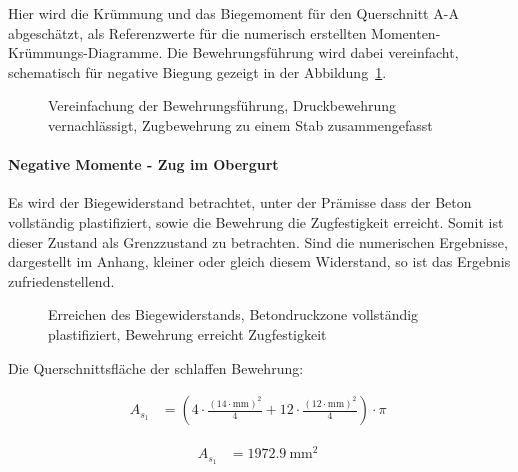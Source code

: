 \documentclass[
  11pt,
  letterpaper,
]{scrreprt}
\let\oldparagraph\paragraph
\renewcommand{\paragraph}[1]{\oldparagraph{#1}\mbox{}}
\begin{document}
Hier wird die Krümmung und das Biegemoment für den Querschnitt A-A
abgeschätzt, als Referenzwerte für die numerisch erstellten
Momenten-Krümmungs-Diagramme. Die Bewehrungsführung wird dabei
vereinfacht, schematisch für negative Biegung gezeigt in der
Abbildung~\ref{fig-t6_qs_approx}.

\begin{figure}[H]


\caption{\label{fig-t6_qs_approx}Vereinfachung der Bewehrungsführung,
Druckbewehrung vernachlässigt, Zugbewehrung zu einem Stab
zusammengefasst}

\end{figure}%

\paragraph{Negative Momente - Zug im
Obergurt}\label{negative-momente---zug-im-obergurt}

Es wird der Biegewiderstand betrachtet, unter der Prämisse dass der
Beton vollständig plastifiziert, sowie die Bewehrung die Zugfestigkeit
erreicht. Somit ist dieser Zustand als Grenzzustand zu betrachten. Sind
die numerischen Ergebnisse, dargestellt im Anhang, kleiner oder gleich
diesem Widerstand, so ist das Ergebnis zufriedenstellend.

\begin{figure}[H]


\caption{\label{fig-t6_qs_MR}Erreichen des Biegewiderstands,
Betondruckzone vollständig plastifiziert, Bewehrung erreicht
Zugfestigkeit}

\end{figure}%

Die Querschnittsfläche der schlaffen Bewehrung:

$$
\begin{aligned}
A_{s_{1}} &= \left( 4 \cdot \frac{ \left( 14 \cdot \mathrm{mm} \right) ^{ 2 } }{ 4 } + 12 \cdot \frac{ \left( 12 \cdot \mathrm{mm} \right) ^{ 2 } }{ 4 } \right) \cdot \pi \; 
\end{aligned}
$$

$$
\begin{aligned}
A_{s_{1}} &= 1972.9\ \mathrm{mm}^{2} \;
\end{aligned}
$$
\end{document}
